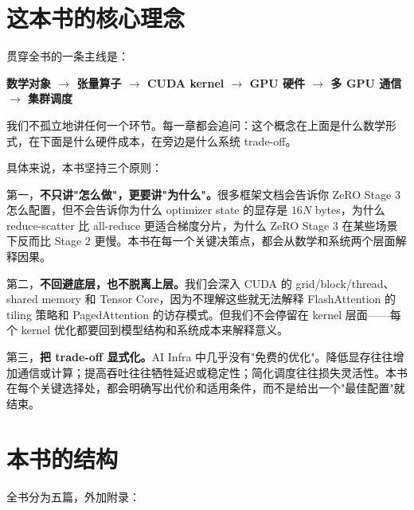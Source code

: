 \section*{这本书的核心理念}

贯穿全书的一条主线是：

\begin{center}
\textbf{数学对象 $\rightarrow$ 张量算子 $\rightarrow$ CUDA kernel $\rightarrow$ GPU 硬件 $\rightarrow$ 多 GPU 通信 $\rightarrow$ 集群调度}
\end{center}

我们不孤立地讲任何一个环节。每一章都会追问：这个概念在上面是什么数学形式，在下面是什么硬件成本，在旁边是什么系统 trade-off。

具体来说，本书坚持三个原则：

第一，\textbf{不只讲"怎么做"，更要讲"为什么"。}很多框架文档会告诉你 ZeRO Stage 3 怎么配置，但不会告诉你为什么 optimizer state 的显存是 $16N$ bytes，为什么 reduce-scatter 比 all-reduce 更适合梯度分片，为什么 ZeRO Stage 3 在某些场景下反而比 Stage 2 更慢。本书在每一个关键决策点，都会从数学和系统两个层面解释因果。

第二，\textbf{不回避底层，也不脱离上层。}我们会深入 CUDA 的 grid/block/thread、shared memory 和 Tensor Core，因为不理解这些就无法解释 FlashAttention 的 tiling 策略和 PagedAttention 的访存模式。但我们不会停留在 kernel 层面——每个 kernel 优化都要回到模型结构和系统成本来解释意义。

第三，\textbf{把 trade-off 显式化。}AI Infra 中几乎没有"免费的优化"。降低显存往往增加通信或计算；提高吞吐往往牺牲延迟或稳定性；简化调度往往损失灵活性。本书在每个关键选择处，都会明确写出代价和适用条件，而不是给出一个"最佳配置"就结束。

\section*{本书的结构}

全书分为五篇，外加附录：

